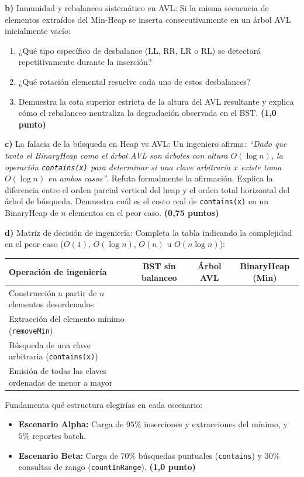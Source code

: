 \documentclass[10pt,a4paper]{article}
\newcommand{\pts}[1]{\textbf{(#1)}}
\begin{document}
\textbf{b)} Inmunidad y rebalanceo sistemático en AVL:
Si la misma secuencia de elementos extraídos del Min-Heap se inserta consecutivamente en un árbol AVL inicialmente vacío:
\begin{enumerate}[label=\roman*.,itemsep=1pt]
\item ¿Qué tipo específico de desbalance (LL, RR, LR o RL) se detectará repetitivamente durante la inserción?
\item ¿Qué rotación elemental resuelve cada uno de estos desbalances?
\item Demuestra la cota superior estricta de la altura del AVL resultante y explica cómo el rebalanceo neutraliza la degradación observada en el BST. \pts{1,0 punto}
\end{enumerate}

\textbf{c)} La falacia de la búsqueda en Heap vs AVL:
Un ingeniero afirma: \emph{``Dado que tanto el BinaryHeap como el árbol AVL son árboles con altura $O(\log n)$, la operación \texttt{contains(x)} para determinar si una clave arbitraria $x$ existe toma $O(\log n)$ en ambos casos''}. Refuta formalmente la afirmación. Explica la diferencia entre el orden parcial vertical del heap y el orden total horizontal del árbol de búsqueda. Demuestra cuál es el costo real de \texttt{contains(x)} en un BinaryHeap de $n$ elementos en el peor caso. \pts{0,75 puntos}

\textbf{d)} Matriz de decisión de ingeniería:
Completa la tabla indicando la complejidad en el peor caso ($O(1)$, $O(\log n)$, $O(n)$ u $O(n \log n)$):

\begin{center}
\renewcommand{\arraystretch}{1.2}
\begin{tabularx}{\textwidth}{|X|c|c|c|}
\hline
\textbf{Operación de ingeniería} & \textbf{BST sin balanceo} & \textbf{Árbol AVL} & \textbf{BinaryHeap (Min)} \\ \hline
Construcción a partir de $n$ elementos desordenados & & & \\ \hline
Extracción del elemento mínimo (\texttt{removeMin}) & & & \\ \hline
Búsqueda de una clave arbitraria (\texttt{contains(x)}) & & & \\ \hline
Emisión de todas las claves ordenadas de menor a mayor & & & \\ \hline
\end{tabularx}
\end{center}

Fundamenta qué estructura elegirías en cada escenario:
\begin{itemize}[itemsep=0.5pt]
\item \textbf{Escenario Alpha:} Carga de $95\%$ inserciones y extracciones del mínimo, y $5\%$ reportes batch.
\item \textbf{Escenario Beta:} Carga de $70\%$ búsquedas puntuales (\texttt{contains}) y $30\%$ consultas de rango (\texttt{countInRange}). \pts{1,0 punto}
\end{itemize}
\end{document}
